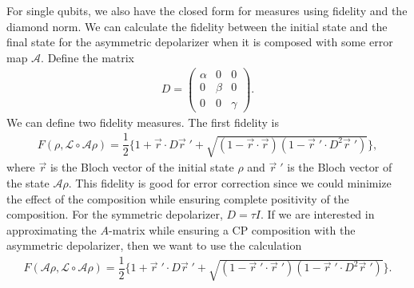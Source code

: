 \documentclass[12pt]{iopart}
\begin{document}
For single qubits, we also have the closed form for measures using fidelity and the diamond norm. We can calculate the fidelity between the initial state and the final state for the asymmetric depolarizer when it is composed with some error map $\mathcal{A}$. Define the matrix
\begin{align}
    D =
    \left(
    \begin{array}{ccc}
       \alpha & 0 & 0 \\
        0 & \beta & 0 \\
        0 & 0 & \gamma
    \end{array}
    \right).
\end{align}
We can define two fidelity measures. The first fidelity is
\begin{align}\label{eq:fidelityErrorCorr}
    F(\rho, \mathcal{L} \circ \mathcal{A} \rho) = \dfrac{1}{2}\bigg\{1+ \vec{r}\cdot D \vec{r} \;' + \sqrt{(1-\vec{r} \cdot \vec{r})(1-\vec{r} \; ' \cdot D^2 \vec{r} \; ')} \bigg\},
\end{align}
where $\vec{r}$ is the Bloch vector of the initial state $\rho$ and $\vec{r} \;'$ is the Bloch vector of the state $\mathcal{A} \rho$. This fidelity is good for error correction since we could minimize the effect of the composition while ensuring complete positivity of the composition. For the symmetric depolarizer, $D=\tau I$. If we are interested in approximating the $A$-matrix while ensuring a CP composition with the asymmetric depolarizer, then we want to use the calculation
\begin{align}\label{eq:fidelityApproxA}
    F(\mathcal{A} \rho, \mathcal{L} \circ \mathcal{A} \rho) = \dfrac{1}{2}\bigg\{1+ \vec{r} \; '\cdot D \vec{r} \;' + \sqrt{(1-\vec{r} \; ' \cdot \vec{r} \; ')(1-\vec{r} \; ' \cdot D^2 \vec{r}\;')} \bigg\}.
\end{align}
\end{document}
